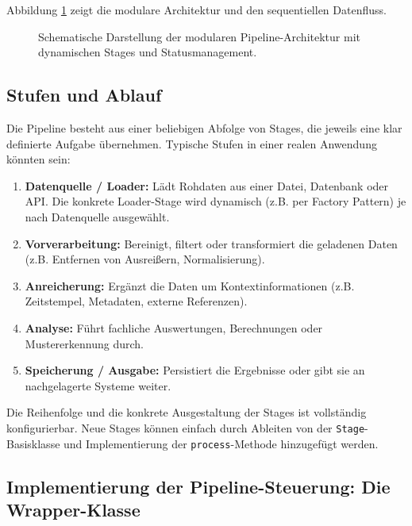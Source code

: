 \documentclass[a4paper]{article} %
\begin{document}
Abbildung \ref{fig:architektur} zeigt die modulare Architektur und den sequentiellen Datenfluss.

\begin{figure}[htbp]
    \centering
    \caption{Schematische Darstellung der modularen Pipeline-Architektur mit dynamischen Stages und Statusmanagement.}
    \label{fig:architektur}
\end{figure}

\subsection{Stufen und Ablauf}

Die Pipeline besteht aus einer beliebigen Abfolge von Stages, die jeweils eine klar definierte Aufgabe übernehmen. Typische Stufen in einer realen Anwendung könnten sein:
\begin{enumerate}
    \item \textbf{Datenquelle / Loader:} Lädt Rohdaten aus einer Datei, Datenbank oder API. Die konkrete Loader-Stage wird dynamisch (z.B. per Factory Pattern) je nach Datenquelle ausgewählt.
    \item \textbf{Vorverarbeitung:} Bereinigt, filtert oder transformiert die geladenen Daten (z.B. Entfernen von Ausreißern, Normalisierung).
    \item \textbf{Anreicherung:} Ergänzt die Daten um Kontextinformationen (z.B. Zeitstempel, Metadaten, externe Referenzen).
    \item \textbf{Analyse:} Führt fachliche Auswertungen, Berechnungen oder Mustererkennung durch.
    \item \textbf{Speicherung / Ausgabe:} Persistiert die Ergebnisse oder gibt sie an nachgelagerte Systeme weiter.
\end{enumerate}

Die Reihenfolge und die konkrete Ausgestaltung der Stages ist vollständig konfigurierbar. Neue Stages können einfach durch Ableiten von der \texttt{Stage}-Basisklasse und Implementierung der \texttt{process}-Methode hinzugefügt werden.

\subsection{Implementierung der Pipeline-Steuerung: Die Wrapper-Klasse}
\end{document}
